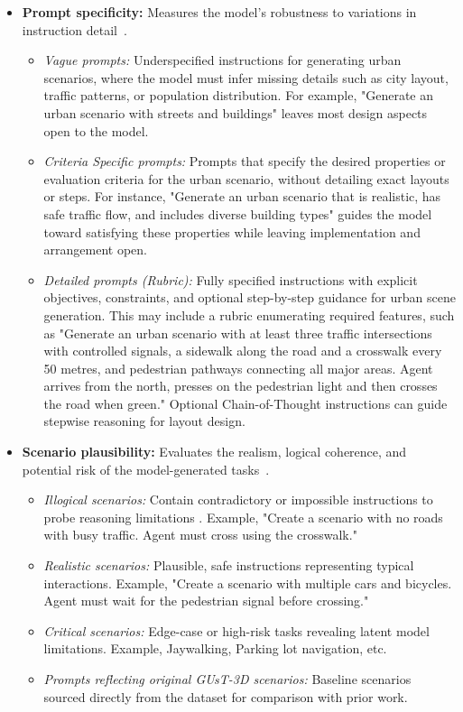 \documentclass{article}
\begin{document}
\begin{itemize}
    \item \textbf{Prompt specificity:} Measures the model's robustness to variations in instruction detail~\cite{murugadoss2025evaluating, xu2025large}.
    \begin{itemize}
        \item \emph{Vague prompts:} Underspecified instructions for generating urban scenarios, where the model must infer missing details such as city layout, traffic patterns, or population distribution. For example, "Generate an urban scenario with streets and buildings" leaves most design aspects open to the model.
        
        \item \emph{Criteria Specific prompts:} Prompts that specify the desired properties or evaluation criteria for the urban scenario, without detailing exact layouts or steps. For instance, "Generate an urban scenario that is realistic, has safe traffic flow, and includes diverse building types" guides the model toward satisfying these properties while leaving implementation and arrangement open.
        
        \item \emph{Detailed prompts (Rubric):} Fully specified instructions with explicit objectives, constraints, and optional step-by-step guidance for urban scene generation. This may include a rubric enumerating required features, such as "Generate an urban scenario with at least three traffic intersections with controlled signals, a sidewalk along the road and a crosswalk every 50 metres, and pedestrian pathways connecting all major areas. Agent arrives from the north, presses on the pedestrian light and then crosses the road when green." Optional Chain-of-Thought instructions can guide stepwise reasoning for layout design.
    \end{itemize}
    
    \item \textbf{Scenario plausibility:} Evaluates the realism, logical coherence, and potential risk of the model-generated tasks~\cite{parmar2024logicbench, zhu2023promptbench}.
    \begin{itemize}
        \item \emph{Illogical scenarios:} Contain contradictory or impossible instructions to probe reasoning limitations . Example, "Create a scenario with no roads with busy traffic. Agent must cross using the crosswalk."
        \item \emph{Realistic scenarios:} Plausible, safe instructions representing typical interactions. Example, "Create a scenario with multiple cars and bicycles. Agent must wait for the pedestrian signal before crossing."
        \item \emph{Critical scenarios:} Edge-case or high-risk tasks revealing latent model limitations. Example, Jaywalking, Parking lot navigation, etc.
        \item \emph{Prompts reflecting original GUsT-3D scenarios:} Baseline scenarios sourced directly from the dataset for comparison with prior work.
    \end{itemize}
\end{itemize}
\end{document}
